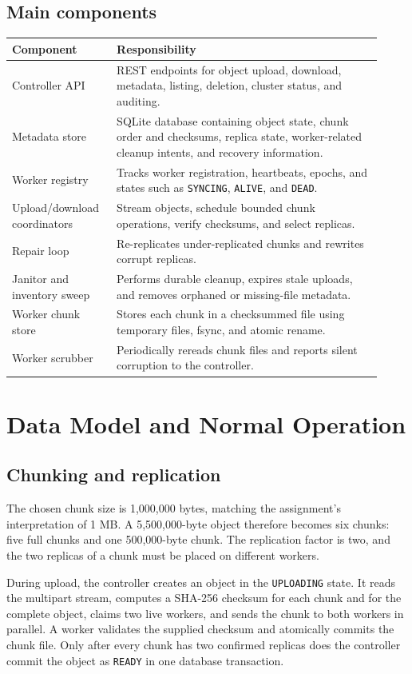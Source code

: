 \documentclass[11pt,a4paper]{article}
\begin{document}
\subsection{Main components}
\begin{longtable}{p{0.25\linewidth}p{0.67\linewidth}}
\toprule
\textbf{Component} & \textbf{Responsibility}\\
\midrule
Controller API & REST endpoints for object upload, download, metadata, listing, deletion, cluster status, and auditing.\\
Metadata store & SQLite database containing object state, chunk order and checksums, replica state, worker-related cleanup intents, and recovery information.\\
Worker registry & Tracks worker registration, heartbeats, epochs, and states such as \texttt{SYNCING}, \texttt{ALIVE}, and \texttt{DEAD}.\\
Upload/download coordinators & Stream objects, schedule bounded chunk operations, verify checksums, and select replicas.\\
Repair loop & Re-replicates under-replicated chunks and rewrites corrupt replicas.\\
Janitor and inventory sweep & Performs durable cleanup, expires stale uploads, and removes orphaned or missing-file metadata.\\
Worker chunk store & Stores each chunk in a checksummed file using temporary files, fsync, and atomic rename.\\
Worker scrubber & Periodically rereads chunk files and reports silent corruption to the controller.\\
\bottomrule
\end{longtable}

\section{Data Model and Normal Operation}

\subsection{Chunking and replication}
The chosen chunk size is 1,000,000 bytes, matching the assignment's interpretation of 1 MB. A 5,500,000-byte object therefore becomes six chunks: five full chunks and one 500,000-byte chunk. The replication factor is two, and the two replicas of a chunk must be placed on different workers.

During upload, the controller creates an object in the \texttt{UPLOADING} state. It reads the multipart stream, computes a SHA-256 checksum for each chunk and for the complete object, claims two live workers, and sends the chunk to both workers in parallel. A worker validates the supplied checksum and atomically commits the chunk file. Only after every chunk has two confirmed replicas does the controller commit the object as \texttt{READY} in one database transaction.
\end{document}
